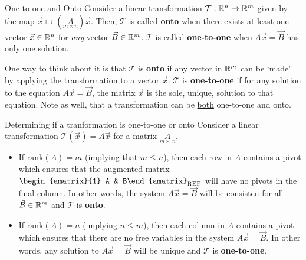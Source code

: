 \begin{defbox}{One-to-one and Onto}{}
    Consider a linear transformation $\mathcal{T}:\mathbb R^{n} \to \mathbb R^{m}$ given by the map $\vec{x} \mapsto \left(\underset{m \times n}{A}\right)\vec{x}$. Then, $\mathcal{T}$ is called \textbf{onto} when there exists at least one vector $\vec{x}\in\mathbb R^{n}$ for \textit{any} vector $\vec{B}\in\mathbb R^{m}$. $\mathcal{T}$ is called \textbf{one-to-one} when $A\vec{x}=\vec{B}$ has only one solution.
\end{defbox}

One way to think about it is that $\mathcal{T}$ is \textbf{onto} if any vector in $\mathbb R^{m}$ can be `made' by applying the transformation to a vector $\vec{x}$. $\mathcal{T}$ is \textbf{one-to-one} if for any solution to the equation $A\vec{x}=\vec{B}$, the matrix $\vec{x}$ is the sole, unique, solution to that equation. Note as well, that a transformation can be \underline{both} one-to-one and onto. 

\begin{impbox}{Determining if a tranformation is one-to-one or onto}{}
    Consider a linear transformation $\mathcal{T}\left(\vec{x}\right) = A\vec{x}$ for a matrix $\underset{m\times\,n}{A}$. 
    \begin{itemize}
        \item If $\text{rank}\left(A\right) = m$ (implying that $m \leq n$), then each row in $A$ contains a pivot which ensures that the augmented matrix $\begin{amatrix}{1} A & B\end{amatrix}_{\text{REF}}$ will have no pivots in the final column. In other words, the system $A\vec{x} = \vec{B}$ will be consisten for all $\vec{B}\in\mathbb R^{m}$ and $\mathcal{T}$ is \textbf{onto}.
        \item If $\text{rank}\left(A\right) = n$ (implying $n \leq m$), then each column in $A$ contains a pivot which ensures that there are no free variables in the system $A\vec{x}=\vec{B}$. In other words, any solution to $A\vec{x}=\vec{B}$ will be unique and $\mathcal{T}$ is \textbf{one-to-one}.
    \end{itemize}
\end{impbox}


